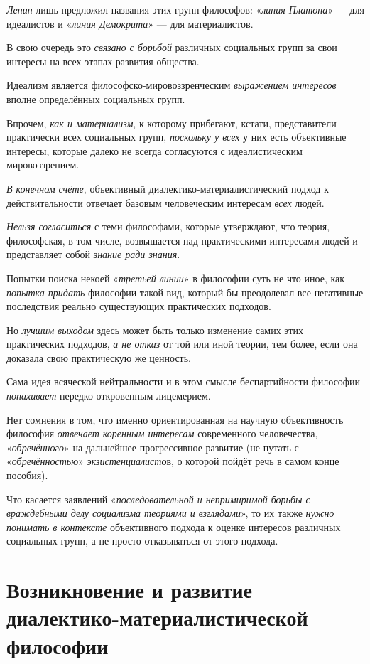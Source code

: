 \documentclass[a4paper,14pt,russian]{extreport}
\begin{document}
\emph{Ленин} лишь предложил названия этих групп философов: «\emph{линия Платона}» --- для идеалистов и «\emph{линия Демокрита}» --- для материалистов.

В свою очередь это \emph{связано с борьбой} различных социальных групп за свои интересы на всех этапах развития общества.

Идеализм является философско-мировоззренческим \emph{выражением интересов} вполне определённых социальных групп.

Впрочем, \emph{как и материализм}, к которому прибегают, кстати, представители практически всех социальных групп, \emph{поскольку у всех} у них есть объективные интересы, которые далеко не всегда согласуются с идеалистическим мировоззрением.

\emph{В конечном счёте}, объективный диалектико-материалистический подход к действительности отвечает базовым человеческим интересам \emph{всех} людей.

\emph{Нельзя согласиться} с теми философами, которые утверждают, что теория, философская, в том числе, возвышается над практическими интересами людей и представляет собой \emph{знание ради знания}.

Попытки поиска некоей «\emph{третьей линии}» в философии суть не что иное, как \emph{попытка придать} философии такой вид, который бы преодолевал все негативные последствия реально существующих практических подходов.

Но \emph{лучшим выходом} здесь может быть только изменение самих этих практических подходов, \emph{а не отказ} от той или иной теории, тем более, если она доказала свою практическую же ценность.

Сама идея всяческой нейтральности и в этом смысле беспартийности философии \emph{попахивает} нередко откровенным лицемерием.

Нет сомнения в том, что именно ориентированная на научную объективность философия \emph{отвечает коренным интересам} современного человечества, «\emph{обречённого}» на дальнейшее прогрессивное развитие (не путать с «\emph{обречённостью}» \emph{экзистенциалисто}в, о которой пойдёт речь в самом конце пособия).

Что касается заявлений «\emph{последовательной и непримиримой борьбы с враждебными делу социализма теориями и взглядами}», то их также \emph{нужно понимать в контексте} объективного подхода к оценке интересов различных социальных групп, а не просто отказываться от этого подхода.

\section{Возникновение и развитие диалектико-материалистической философии}
\end{document}
